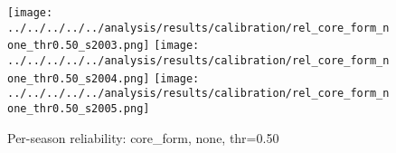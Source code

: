 \begin{figure}[t]
  \centering
  \caption[Per-season reliability: core_form, none, thr=0.50]{Per-season reliability: core_form, none, thr=0.50}
  \texttt{[image: ../../../../../analysis/results/calibration/rel\_core\_form\_none\_thr0.50\_s2003.png]}
  \texttt{[image: ../../../../../analysis/results/calibration/rel\_core\_form\_none\_thr0.50\_s2004.png]}
  \texttt{[image: ../../../../../analysis/results/calibration/rel\_core\_form\_none\_thr0.50\_s2005.png]}
\end{figure}
